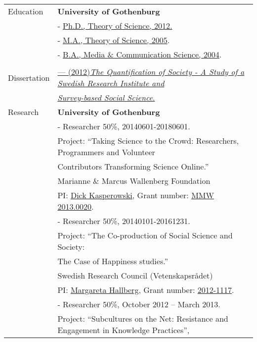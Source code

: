 \documentclass[a4paper,11pt,oneside]{article}
\begin{document}
\noindent \begin{tabular}{@{} l l}
 \Large{Education}    & \textbf{University of Gothenburg} \\
     & - \href{http://files.christopherkullenberg.se/doctoraldegreeonline.pdf}{Ph.D., Theory of Science, 2012.} \\
     & - \href{http://files.christopherkullenberg.se/examengrundutbildningonline.pdf}{M.A., Theory of Science, 2005}. \\
     & - \href{http://files.christopherkullenberg.se/examengrundutbildningonline.pdf}{B.A., Media \& Communication Science, 2004}. \\
     & \\

 \Large{Dissertation}    & \href{http://hdl.handle.net/2077/28807}{--- (2012)\emph{The Quantification of Society - A Study of a Swedish Research Institute and}} \\
    & \parbox{5.0in}{\href{http://hdl.handle.net/2077/28807}{\emph{Survey-based Social Science}.}}
    & \\
 \Large{Research}    & \textbf{University of Gothenburg} \\
     & - Researcher 50\%, 20140601-20180601. \\
     & Project: ``Taking Science to the Crowd: Researchers, Programmers and Volunteer  \\
     & Contributors Transforming Science Online.''\\
     & Marianne \& Marcus Wallenberg Foundation\\
     & PI: \href{mailto:dick.kasperowski@gu.se}{Dick Kasperowski}, Grant number: \href{https://www.wallenberg.com/MMW/projektanslag-2013}{MMW 2013.0020}.\\
     & - Researcher 50\%, 20140101-20161231. \\
     & Project: ``The Co-production of Social Science and Society:   \\
     & The Case of Happiness studies.''\\
     & Swedish Research Council (Vetenskapsrådet)\\
     & PI: \href{mailto:margareta.hallberg@gu.se}{Margareta Hallberg}, Grant number: \href{http://vrproj.vr.se/detail.asp?arendeid=90421}{2012-1117}.\\
     & - Researcher 50\%, October 2012 – March 2013.\\
     & Project: ``Subcultures on the Net: Resistance and Engagement in Knowledge Practices'', \\

\end{tabular}
\end{document}
